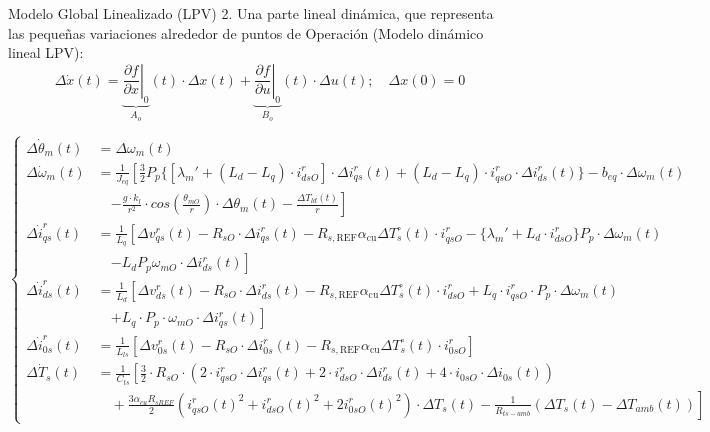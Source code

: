 \documentclass[12pt]{beamer}
\begin{document}
\begin{frame}{Modelo Global Linealizado (LPV)}\tiny
2. Una parte lineal dinámica, que representa las pequeñas variaciones alrededor de puntos de Operación (Modelo dinámico lineal LPV):
\begin{equation}
\Delta\dot{x}(t) = \underbrace{\left.\frac{\partial f}{\partial x}\right|_0}_{A_o}(t)\cdot\Delta x(t) + \underbrace{\left.\frac{\partial f}{\partial u}\right|_0}_{B_o}(t)\cdot\Delta u(t); \quad \Delta x(0) = 0
\label{Ec.30}
\end{equation}

\begin{equation}
\left\{
\begin{aligned}
\Delta\dot{\theta}_m(t) &= \Delta\omega_m(t) \\
\Delta\dot{\omega}_m(t) &= \frac{1}{J_{eq}}\left[\frac{3}{2} P_p\{[\lambda_m' + (L_d - L_q)\cdot i^r_{dsO}]\cdot\Delta i^r_{qs}(t) + (L_d - L_q)\cdot i^r_{qsO}\cdot\Delta i^r_{ds}(t)\} - b_{eq}\cdot\Delta\omega_m(t)\right. \\
&\quad \left. -\frac{g\cdot k_l}{r^2} \cdot cos(\frac{\theta_{mO}}{r})\cdot\Delta\theta_m(t) - \frac{\Delta T_{ld}(t)}{r}\right] \\
\Delta\dot{i}^r_{qs}(t) &= \frac{1}{L_q}\left[\Delta v^r_{qs}(t) - R_{sO}\cdot\Delta i^r_{qs}(t) - R_{s, \text{REF}}\alpha_\text{cu}\Delta T^\circ_s(t)\cdot i^r_{qsO} - \{\lambda_m' + L_d\cdot i^r_{dsO}\} P_p\cdot\Delta\omega_m(t)\right. \\
&\quad \left. - L_d P_p\omega_{mO}\cdot\Delta i^r_{ds}(t)\right] \\
\Delta\dot{i}^r_{ds}(t) &= \frac{1}{L_d}\left[\Delta v^r_{ds}(t) - R_{sO}\cdot\Delta i^r_{ds}(t) - R_{s, \text{REF}}\alpha_\text{cu}\Delta T^\circ_s(t)\cdot i^r_{dsO} + L_q\cdot i^r_{qsO}\cdot P_p\cdot\Delta\omega_m(t)\right. \\
&\quad \left. + L_q\cdot P_p\cdot\omega_{mO}\cdot\Delta i^r_{qs}(t)\right] \\
\Delta\dot{i}^r_{0s}(t) &= \frac{1}{L_{ls}}\left[\Delta v^r_{0s}(t) - R_{sO}\cdot\Delta i^r_{0s}(t) - R_{s, \text{REF}}\alpha_\text{cu}\Delta T^\circ_s(t)\cdot i^r_{0sO}\right] \\
\Delta\dot{T}_s(t) &= \frac{1}{C_{ts}}\left[\frac{3}{2}\cdot R_{sO}\cdot(2\cdot i^r_{qsO}\cdot\Delta i^r_{qs}(t) + 2\cdot i^r_{dsO}\cdot\Delta i^r_{ds}(t) + 4\cdot i_{0sO}\cdot\Delta i_{0s}(t))\right. \\
&\quad + \left. \frac{3\alpha_{cu}R_{sREF}}{2}(i^r_{qsO}(t)^2 + i^r_{dsO}(t)^2 + 2i^r_{0sO}(t)^2)\cdot\Delta T_s(t) - \frac{1}{R_{ts-amb}}(\Delta T_s(t) - \Delta T_{amb}(t))\right]
\end{aligned}
\right.
\label{eq:SistemaGlobalLPV}
\end{equation}
\end{frame}
\end{document}
